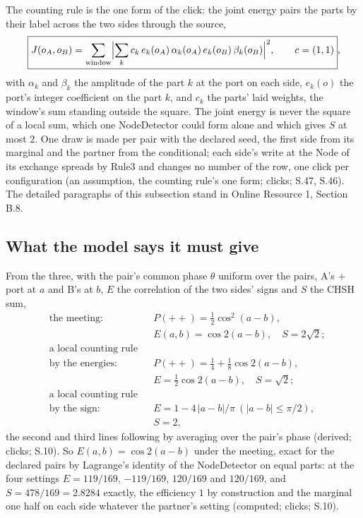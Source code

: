 \documentclass[pdflatex,sn-mathphys-num]{sn-jnl}
\theoremstyle{thmstyleone}
\theoremstyle{thmstyletwo}
\begin{document}
The counting rule is the one form of the click: the joint energy pairs the parts by their label across the two sides through the source,
\begin{equation}\label{eq:joint}
\boxed{J(o_A, o_B) = \sum_{\text{window}}\Bigl|\sum_k c_k\,e_k(o_A)\,\alpha_k(o_A)\,e_k(o_B)\,\beta_k(o_B)\Bigr|^2, \qquad c = (1, 1)},
\end{equation}
with $\alpha_k$ and $\beta_k$ the amplitude of the part $k$ at the port on each side, $e_k(o)$ the port's integer coefficient on the part $k$, and $c_k$ the parts' laid weights, the window's sum standing outside the square. The joint energy is never the square of a local sum, which one NodeDetector could form alone and which gives $S$ at most $2$. One draw is made per pair with the declared seed, the first side from its marginal and the partner from the conditional; each side's write at the Node of its exchange spreads by Rule3 and changes no number of the row, one click per configuration (an assumption, the counting rule's one form; clicks; S.47, S.46). The detailed paragraphs of this subsection stand in Online Resource 1, Section B.8.

\subsection{What the model says it must give}\label{sec:bell-blind}

From the three, with the pair's common phase $\theta$ uniform over the pairs, A's $+$ port at $a$ and B's at $b$, $E$ the correlation of the two sides' signs and $S$ the CHSH sum,
\begin{equation}\label{eq:bell}
\begin{aligned}
&\text{the meeting:} && P(++) = \tfrac{1}{2}\cos^2(a - b),\\
&&& E(a, b) = \cos 2(a - b), \quad S = 2\sqrt 2;\\
&\text{a local counting rule}\\
&\text{by the energies:} && P(++) = \tfrac{1}{4} + \tfrac{1}{8}\cos 2(a - b),\\
&&& E = \tfrac{1}{2}\cos 2(a - b), \quad S = \sqrt 2;\\
&\text{a local counting rule}\\
&\text{by the sign:} && E = 1 - 4\,|a - b| / \pi \ (|a - b| \le \pi / 2),\\
&&& S = 2,
\end{aligned}
\end{equation}
the second and third lines following by averaging over the pair's phase (derived; clicks; S.10). So $E(a, b) = \cos 2(a - b)$ under the meeting, exact for the declared pairs by Lagrange's identity of the NodeDetector on equal parts: at the four settings $E = 119 / 169$, $-119 / 169$, $120 / 169$ and $120 / 169$, and $S = 478 / 169 = 2.8284$ exactly, the efficiency $1$ by construction and the marginal one half on each side whatever the partner's setting (computed; clicks; S.10).
\end{document}
